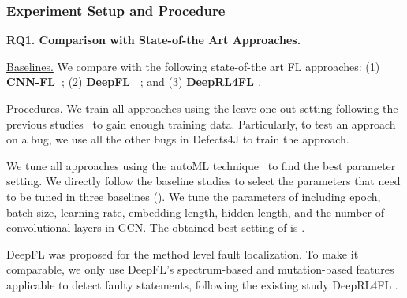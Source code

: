 \subsubsection{Experiment Setup and Procedure}
\hspace{1cm}

{\bf RQ1. Comparison with State-of-the Art Approaches.}

\underline{Baselines.} We compare {\tool} with the following state-of-the art FL approaches: (1) \textbf{CNN-FL~\cite{zhang2019cnn}}; (2) {\bf DeepFL~\cite{DeepFL}} ; and (3) {\bf DeepRL4FL \cite{li2021fault}}.


\underline{Procedures.} We train all approaches using the leave-one-out setting following the previous studies~\cite{DeepFL, TraPT} to gain enough training data. %
Particularly, to test an approach on a bug, we use all the other bugs in Defects4J to train the approach.

We tune all approaches using the autoML technique~\cite{NNI} to find the best parameter setting. 
We directly follow the baseline studies to select the parameters that need to be tuned in three baselines ({\color{red}{you do not need to specify the parameters for baselines? you let autoML to select parameters?}}). We tune the parameters of {\tool} including epoch, batch size, learning rate, embedding length, hidden length, and the number of convolutional layers in GCN. The obtained best setting of {\tool} is {\color{red}{xxxxxx}}.

DeepFL was proposed for the method level fault localization. 
To make it comparable, we only use DeepFL's spectrum-based and mutation-based features applicable to detect faulty statements, following the existing study DeepRL4FL \cite{li2021fault}. 

